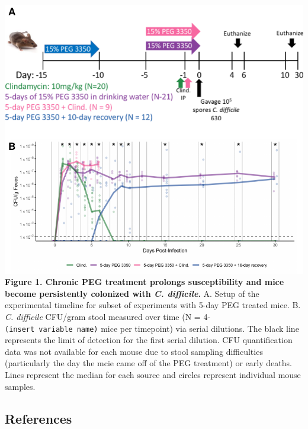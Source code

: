 \documentclass[
  11pt,
]{article}
\begin{document}
\includegraphics{figure_1.pdf} \textbf{Figure 1. Chronic PEG treatment
prolongs susceptibility and mice become persistently colonized with
\emph{C. difficile}.} A. Setup of the experimental timeline for subset
of experiments with 5-day PEG treated mice. B. \emph{C. difficile}
CFU/gram stool measured over time (N =
4-\texttt{(insert\ variable\ name)} mice per timepoint) via serial
dilutions. The black line represents the limit of detection for the
first serial dilution. CFU quantification data was not available for
each mouse due to stool sampling difficulties (particularly the day the
mcie came off of the PEG treatment) or early deaths. Lines represent the
median for each source and circles represent individual mouse samples.

\newpage

\hypertarget{references}{%
\subsection{References}\label{references}}
\end{document}
